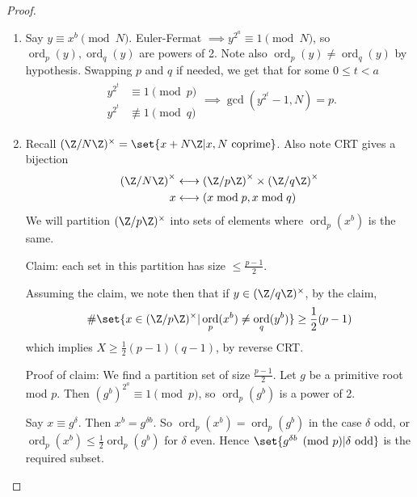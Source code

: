 \documentclass{article}
\newcommand{\1}[1]{\mathbbm{1}_{#1}}
\DeclareMathOperator{\ord}{ord}
\begin{document}
\begin{proof}\leavevmode
    \begin{enumerate}[label=(\roman*)]
        \item Say $y \equiv x^b \pmod{N}$. Euler-Fermat $\implies y^{2^a} \equiv 1 \pmod{N}$, so $\ord_p(y), \ord_q(y)$ are powers of 2.
            Note also $\ord_p(y) \neq \ord_q(y)$ by hypothesis.
            Swapping $p$ and $q$ if needed, we get that for some $0 \leq t < a$
            \begin{gather*}
                \begin{aligned}
                y^{2^t} &\equiv 1 \pmod{p} \\
                y^{2^t} &\not\equiv 1 \pmod{q}
                \end{aligned}
                \implies \gcd(y^{2^t} - 1, N) = p.
            \end{gather*}
        \item Recall $(\Z/N\Z)^\times = \set{x + N \Z | x, N \text{ coprime}}$. Also note CRT gives a bijection
            \begin{align*}
                \left({\Z}/{N\Z}\right)^\times & \longleftrightarrow \left({\Z}/{p\Z}\right)^\times \times \left({\Z}/{q\Z}\right)^\times \\
                x & \longleftrightarrow (x \bmod{p}, x \bmod{q})
            \end{align*}
            We will partition $(\Z/p\Z)^\times$ into sets of elements where $\ord_p(x^b)$ is the same.

            Claim: each set in this partition has size $\leq \frac{p-1}{2}$.

            Assuming the claim, we note then that if $y \in (\Z/q\Z)^\times$, by the claim,
            \begin{equation*}
                \# \set{x \in (\Z/p\Z)^\times | \ord_p(x^b) \neq \ord_q(y^b)} \geq \frac{1}{2}(p-1)
            \end{equation*}
            which implies $X \geq \frac{1}{2}(p-1)(q-1)$, by reverse CRT.

            Proof of claim:
            We find a partition set of size $\frac{p-1}{2}$.
            Let $g$ be a primitive root mod $p$.
            Then $(g^b)^{2^a} \equiv 1 \pmod{p}$, so $\ord_p(g^b)$ is a power of 2.

            Say $x \equiv g^\delta$. Then $x^b = g^{\delta b}$. So $\ord_p(x^b) = \ord_p(g^b)$ in the case $\delta$ odd, or $\ord_p(x^b) \leq \frac{1}{2} \ord_p(g^b)$ for $\delta$ even.
            Hence $\set{g^{\delta b} \pmod{p} | \delta \text{ odd}}$ is the required subset. \qedhere
    \end{enumerate}
\end{proof}
\end{document}
